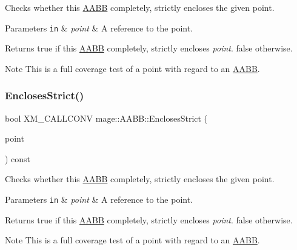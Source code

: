 Checks whether this \hyperlink{classmage_1_1_a_a_b_b}{A\+A\+BB} completely, strictly encloses the given point.


\begin{DoxyParams}[1]{Parameters}
\mbox{\tt in}  & {\em point} & A reference to the point. \\
\hline
\end{DoxyParams}
\begin{DoxyReturn}{Returns}
{\ttfamily true} if this \hyperlink{classmage_1_1_a_a_b_b}{A\+A\+BB} completely, strictly encloses {\itshape point}. {\ttfamily false} otherwise. 
\end{DoxyReturn}
\begin{DoxyNote}{Note}
This is a full coverage test of a point with regard to an \hyperlink{classmage_1_1_a_a_b_b}{A\+A\+BB}. 
\end{DoxyNote}
\hypertarget{classmage_1_1_a_a_b_b_aa8946038ce497c79fa0ee34e87aa9aed}{}\label{classmage_1_1_a_a_b_b_aa8946038ce497c79fa0ee34e87aa9aed} 
\subsubsection{\texorpdfstring{Encloses\+Strict()}{EnclosesStrict()}\hspace{0.1cm}{\footnotesize\ttfamily [2/4]}}
{\footnotesize\ttfamily bool X\+M\+\_\+\+C\+A\+L\+L\+C\+O\+NV mage\+::\+A\+A\+B\+B\+::\+Encloses\+Strict (\begin{DoxyParamCaption}\item[{F\+X\+M\+V\+E\+C\+T\+OR}]{point }\end{DoxyParamCaption}) const\hspace{0.3cm}{\ttfamily [noexcept]}}

Checks whether this \hyperlink{classmage_1_1_a_a_b_b}{A\+A\+BB} completely, strictly encloses the given point.


\begin{DoxyParams}[1]{Parameters}
\mbox{\tt in}  & {\em point} & A reference to the point. \\
\hline
\end{DoxyParams}
\begin{DoxyReturn}{Returns}
{\ttfamily true} if this \hyperlink{classmage_1_1_a_a_b_b}{A\+A\+BB} completely, strictly encloses {\itshape point}. {\ttfamily false} otherwise. 
\end{DoxyReturn}
\begin{DoxyNote}{Note}
This is a full coverage test of a point with regard to an \hyperlink{classmage_1_1_a_a_b_b}{A\+A\+BB}. 
\end{DoxyNote}
\hypertarget{classmage_1_1_a_a_b_b_af037df0800e1e8c3564363f154c2424a}{}\label{classmage_1_1_a_a_b_b_af037df0800e1e8c3564363f154c2424a} 
